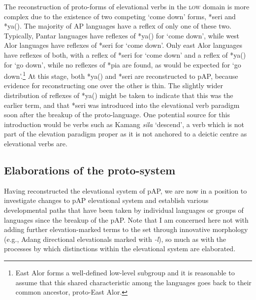 The reconstruction of proto-forms of elevational verbs in the \textsc{low} domain is more complex due to the existence of two competing `come down' forms, *seri and *ya({\ng}). The majority of AP languages have a reflex of only one of these two. Typically, Pantar languages have reflexes of *ya({\ng}) for `come down', while west Alor languages have reflexes of *seri for `come down'. Only east Alor languages have reflexes of both, with a reflex of *seri for `come down' and a reflex of *ya({\ng}) for `go down', while no reflexes of *pia are found, as would be expected for `go down'.\footnote{{}  East Alor forms a well-defined low-level subgroup and it is reasonable to assume that this shared characteristic among the languages goes back to their common ancestor, proto-East Alor.} At this stage, both *ya({\ng}) and *seri are reconstructed to pAP, because evidence for reconstructing one over the other is thin. The slightly wider distribution of reflexes of *ya({\ng}) might be taken to indicate that this was the earlier term, and that *seri was introduced into the elevational verb paradigm soon after the breakup of the proto-language. One potential source for this introduction would be verbs such as Kamang \textit{sila}\textit{{\ng}} `descend', a verb which is not part of the elevation paradigm proper as it is not anchored to a deictic centre as elevational verbs are.

\subsection{Elaborations of the proto-system}
Having reconstructed the elevational system of pAP, we are now in a position to investigate changes to pAP elevational system and establish various developmental paths that have been taken by individual languages or groups of languages since the breakup of the pAP. Note that I am concerned here not with adding further elevation-marked terms to the set through innovative morphology (e.g., Adang directional elevationals marked with \textit{{}-}\textit{l}\textit{{\textepsilon}}), so much as with the processes by which distinctions within the elevational system are elaborated.

